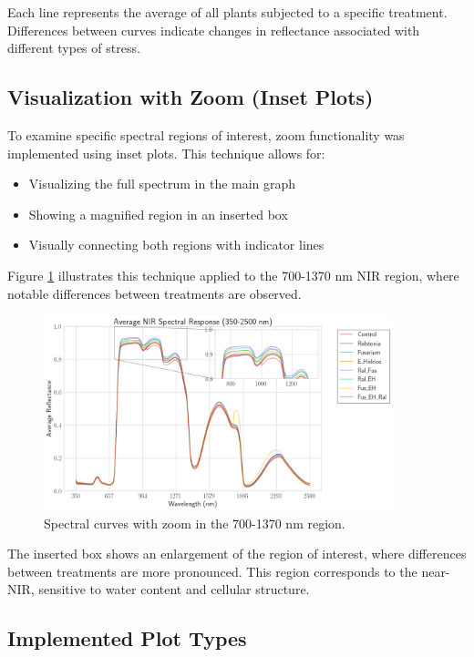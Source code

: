 \documentclass[12pt,a4paper]{article}
\begin{document}
Each line represents the average of all plants subjected to a specific treatment. Differences between curves indicate changes in reflectance associated with different types of stress.

\subsection{Visualization with Zoom (Inset Plots)}

To examine specific spectral regions of interest, zoom functionality was implemented using inset plots. This technique allows for:

\begin{itemize}
    \item Visualizing the full spectrum in the main graph
    \item Showing a magnified region in an inserted box
    \item Visually connecting both regions with indicator lines
\end{itemize}

Figure \ref{fig:spectral_zoom} illustrates this technique applied to the 700-1370 nm NIR region, where notable differences between treatments are observed.

\begin{figure}[H]
    \centering
    \includegraphics[width=0.9\textwidth]{Plots/ZOOM.png}
    \caption{Spectral curves with zoom in the 700-1370 nm region. }
    \label{fig:spectral_zoom}
\end{figure}

The inserted box shows an enlargement of the region of interest, where differences between treatments are more pronounced. This region corresponds to the near-NIR, sensitive to water content and cellular structure.

\subsection{Implemented Plot Types}
\end{document}
